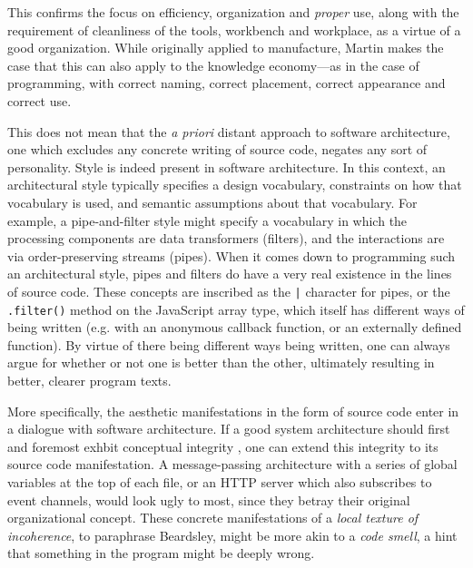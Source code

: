 This confirms the focus on efficiency, organization and \emph{proper} use, along with the requirement of cleanliness of the tools, workbench and workplace, as a virtue of a good organization. While originally applied to manufacture, Martin makes the case that this can also apply to the knowledge economy—as in the case of programming, with correct naming, correct placement, correct appearance and correct use.

This does not mean that the \emph{a priori} distant approach to software architecture, one which excludes any concrete writing of source code, negates any sort of personality. Style is indeed present in software architecture. In this context, an architectural style typically specifies a design vocabulary, constraints on how that vocabulary is used, and semantic assumptions about that vocabulary. For example, a pipe-and-filter style might specify a vocabulary in which the processing components are data transformers (filters), and the interactions are via order-preserving streams (pipes). When it comes down to programming such an architectural style, pipes and filters do have a very real existence in the lines of source code. These concepts are inscribed as the \lstinline{|} character for pipes, or the \lstinline{.filter()} method on the JavaScript array type, which itself has different ways of being written (e.g. with an anonymous callback function, or an externally defined function). By virtue of there being different ways being written, one can always argue for whether or not one is better than the other, ultimately resulting in better, clearer program texts.

More specifically, the aesthetic manifestations in the form of source code enter in a dialogue with software architecture. If a good system architecture should first and foremost exhbit conceptual integrity \citep{spinellis_beautiful_2009}, one can extend this integrity to its source code manifestation. A message-passing architecture with a series of global variables at the top of each file, or an HTTP server which also subscribes to event channels, would look ugly to most, since they betray their original organizational concept. These concrete manifestations of a \emph{local texture of incoherence}, to paraphrase Beardsley, might be more akin to a \emph{code smell}, a hint that something in the program might be deeply wrong.

